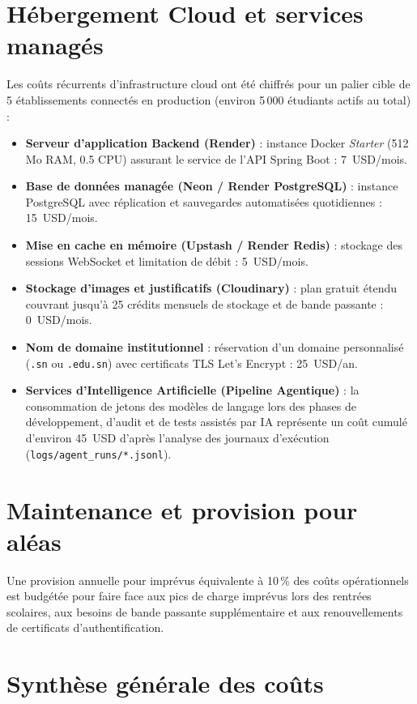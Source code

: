 \section{Hébergement Cloud et services managés}

Les coûts récurrents d'infrastructure cloud ont été chiffrés pour un palier cible de 5 établissements connectés en production (environ 5\,000 étudiants actifs au total) :
\begin{itemize}
    \item \textbf{Serveur d'application Backend (Render)} : instance Docker \emph{Starter} (512 Mo RAM, 0.5 CPU) assurant le service de l'API Spring Boot : 7~USD/mois.
    \item \textbf{Base de données managée (Neon / Render PostgreSQL)} : instance PostgreSQL avec réplication et sauvegardes automatisées quotidiennes : 15~USD/mois.
    \item \textbf{Mise en cache en mémoire (Upstash / Render Redis)} : stockage des sessions WebSocket et limitation de débit : 5~USD/mois.
    \item \textbf{Stockage d'images et justificatifs (Cloudinary)} : plan gratuit étendu couvrant jusqu'à 25 crédits mensuels de stockage et de bande passante : 0~USD/mois.
    \item \textbf{Nom de domaine institutionnel} : réservation d'un domaine personnalisé (\texttt{.sn} ou \texttt{.edu.sn}) avec certificats TLS Let's Encrypt : 25~USD/an.
    \item \textbf{Services d'Intelligence Artificielle (Pipeline Agentique)} : la consommation de jetons des modèles de langage lors des phases de développement, d'audit et de tests assistés par IA représente un coût cumulé d'environ 45~USD d'après l'analyse des journaux d'exécution (\nolinkurl{logs/agent_runs/*.jsonl}).
\end{itemize}

\section{Maintenance et provision pour aléas}

Une provision annuelle pour imprévus équivalente à 10\,\% des coûts opérationnels est budgétée pour faire face aux pics de charge imprévus lors des rentrées scolaires, aux besoins de bande passante supplémentaire et aux renouvellements de certificats d'authentification.

\section{Synthèse générale des coûts}

